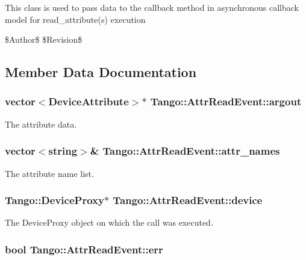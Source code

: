 This class is used to pass data to the callback method in asynchronous callback model for read\-\_\-attribute(s) execution

\$\-Author\$ \$\-Revision\$ 

\subsection{Member Data Documentation}
\subsubsection[{argout}]{\setlength{\rightskip}{0pt plus 5cm}vector$<$Device\-Attribute$>$$\ast$ Tango\-::\-Attr\-Read\-Event\-::argout}\label{classTango_1_1AttrReadEvent_afb3a4d42905139147b8f3badae37f509}


The attribute data. 

\subsubsection[{attr\-\_\-names}]{\setlength{\rightskip}{0pt plus 5cm}vector$<$string$>$\& Tango\-::\-Attr\-Read\-Event\-::attr\-\_\-names}\label{classTango_1_1AttrReadEvent_aba1abaa8dd0c0513945d73297d6f31e2}


The attribute name list. 

\subsubsection[{device}]{\setlength{\rightskip}{0pt plus 5cm}Tango\-::\-Device\-Proxy$\ast$ Tango\-::\-Attr\-Read\-Event\-::device}\label{classTango_1_1AttrReadEvent_acf3b676448255116ba14ee7c7bc4e062}


The Device\-Proxy object on which the call was executed. 

\subsubsection[{err}]{\setlength{\rightskip}{0pt plus 5cm}bool Tango\-::\-Attr\-Read\-Event\-::err}\label{classTango_1_1AttrReadEvent_a81fa0b8b572d1dd3328afb21c747b34a}


